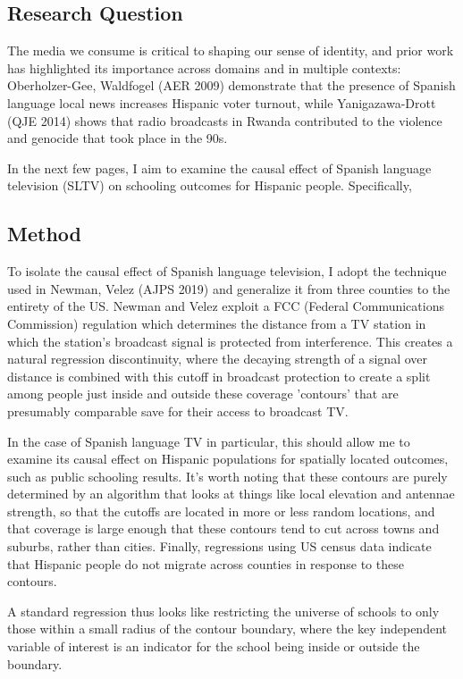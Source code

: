 \documentclass{article}
\begin{document}
\subsection*{Research Question}

The media we consume is critical to shaping our sense of identity, and prior work has highlighted its importance across domains and in multiple contexts: Oberholzer-Gee, Waldfogel (AER 2009) demonstrate that the presence of Spanish language local news increases Hispanic voter turnout, while Yanigazawa-Drott (QJE 2014) shows that radio broadcasts in Rwanda contributed to the violence and genocide that took place in the 90s.

In the next few pages, I aim to examine the causal effect of Spanish language television (SLTV) on schooling outcomes for Hispanic people. Specifically,


\subsection*{Method}

To isolate the causal effect of Spanish language television, I adopt the technique used in Newman, Velez (AJPS 2019) and generalize it from three counties to the entirety of the US. Newman and Velez exploit a FCC (Federal Communications Commission) regulation which determines the distance from a TV station in which the station's broadcast signal is protected from interference. This creates a natural regression discontinuity, where the decaying strength of a signal over distance is combined with this cutoff in broadcast protection to create a split among people just inside and outside these coverage 'contours' that are presumably comparable save for their access to broadcast TV. 

In the case of Spanish language TV in particular, this should allow me to examine its causal effect on Hispanic populations for spatially located outcomes, such as public schooling results. It's worth noting that these contours are purely determined by an algorithm that looks at things like local elevation and antennae strength, so that the cutoffs are located in more or less random locations, and that coverage is large enough that these contours tend to cut across towns and suburbs, rather than cities. Finally, regressions using US census data indicate that Hispanic people do not migrate across counties in response to these contours.

A standard regression thus looks like restricting the universe of schools to only those within a small radius of the contour boundary, where the key independent variable of interest is an indicator for the school being inside or outside the boundary.
\end{document}
